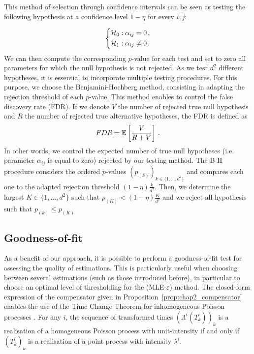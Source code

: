    This method of selection through confidence intervals can be seen as testing the following hypothesis at a confidence level $1-\eta$ for every $i,j$:
   
   \[
   \begin{dcases}
       \mathcal{H}_0 : \alpha_{ij} = 0 \,,\\
       \mathcal{H}_1 : \alpha_{ij} \neq 0\,.
   \end{dcases}
   \]
   We can then compute the corresponding $p$-value for each test and set to zero all parameters for which the null hypothesis is not rejected. As we test $d^2$ different hypotheses, it is essential to incorporate multiple testing procedures. For this purpose, we choose the Benjamini-Hochberg method, consisting in adapting the rejection threshold of each $p$-value. This method enables to control the false discovery rate (FDR). If we denote $V$ the number of rejected true null hypothesis and $R$ the number of rejected true alternative hypotheses, the FDR is defined as \[FDR = {\mathbb E}\left[\frac{V}{R+V}\right]\,.\] In other words, we control the expected number of true null hypotheses (i.e. parameter $\alpha_{ij}$ is equal to zero) rejected by our testing method. The B-H procedure considers the ordered $p$-values $(p_{(k)})_{k\in\{1, \ldots, d^2\}}$ and compares each one to the adapted rejection threshold $(1-\eta) \frac{k}{d^2}$. Then, we determine the largest $K\in\{1, \ldots, d^2\}$ such that $p_{(K)} < (1-\eta) \frac{K}{d^2}$ and we reject all hypothesis such that $p_{(k)} \leq p_{(K)}$

  \subsection{Goodness-of-fit}\label{sec:chap2_goodness}
    As a benefit of our approach, it is possible to perform a goodness-of-fit test for assessing the quality of estimations. This is particularly useful when choosing between several estimations (such as those introduced before), in particular to choose an optimal level of thresholding for the (MLE-$\varepsilon$) method.
    The closed-form expression of the compensator given in Proposition~\ref{prop:chap2_compensator} enables the use of the Time Change Theorem for inhomogeneous Poisson processes \cite[Proposition 7.4.IV]{DaleyV1}.
    For any $i$, the sequence of transformed times $(\Lambda^i(T_k^i))_k$ is a realisation of a homogeneous Poisson process with unit-intensity if and only if $(T_k^i)_k$ is a realisation of a point process with intensity $\lambda^i$.

